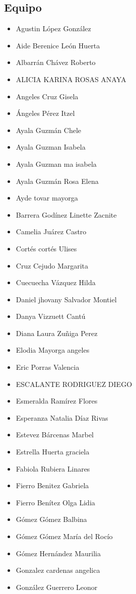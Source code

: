 \begin{spacing}{0.5}
\begin{paracol}{2}
\section*{Equipo}
\begin{itemize}
\item Agustin López González
\item Aide Berenice León Huerta
\item Albarrán Chávez Roberto
\item ALICIA KARINA ROSAS ANAYA
\item Angeles Cruz Gisela
\item Ángeles Pérez Itzel
\item Ayala Guzmán Chele
\item Ayala Guzman Isabela
\item Ayala Guzman ma isabela
\item Ayala Guzmán Rosa Elena
\item Ayde tovar mayorga
\item Barrera Godínez Linette Zacnite
\item Camelia Juárez Castro
\item Cortés cortés Ulises
\item Cruz Cejudo Margarita
\item Cuecuecha Vázquez Hilda
\item Daniel jhovany Salvador Montiel
\item Danya Vizzuett Cantú
\item Diana Laura Zuñiga Perez
\item Elodia Mayorga angeles
\item Eric Porras Valencia
\item ESCALANTE RODRIGUEZ DIEGO
\item Esmeralda Ramírez Flores
\item Esperanza Natalia Díaz Rivas
\item Estevez Bárcenas Marbel
\item Estrella Huerta graciela
\item Fabiola Rubiera Linares
\item Fierro Benitez Gabriela
\item Fierro Benítez Olga Lidia
\item Gómez Gómez Balbina
\item Gómez Gómez María del Rocío
\item Gómez Hernández Maurilia
\item Gonzalez cardenas angelica
\item González Guerrero Leonor

\end{itemize}
\end{paracol}
\end{spacing}

